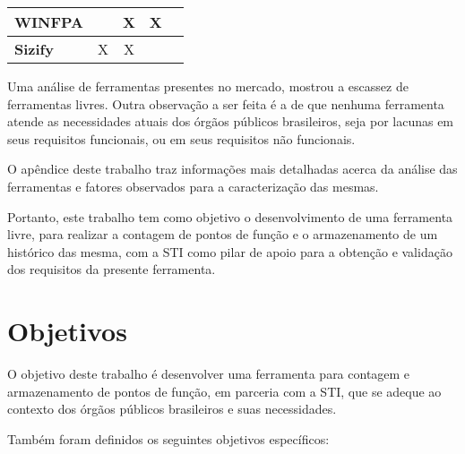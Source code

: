 \begin{table}[]
{\begin{tabular}{|l|c|c|c|c|}
\textbf{WINFPA}                                                              &                               & X                                                                                 & X                           &                              \\ \hline
\textbf{Sizify}                                                              & X                             & X                                                                                 &                             &                              \\ \hline
\end{tabular}
}
\end{table}

Uma análise de ferramentas presentes no mercado, mostrou a escassez de ferramentas livres. Outra observação a ser feita é a de que nenhuma ferramenta atende as necessidades atuais dos órgãos públicos brasileiros, seja por lacunas em seus requisitos funcionais, ou em seus requisitos não funcionais.

O apêndice  deste trabalho traz informações mais detalhadas acerca da análise das ferramentas e fatores observados para a caracterização das mesmas.

Portanto, este trabalho tem como objetivo o desenvolvimento de uma ferramenta livre, para realizar a contagem de pontos de função e o armazenamento de um histórico das mesma, com a STI como pilar de apoio para a obtenção e validação dos requisitos da presente ferramenta.

\section{Objetivos}

O objetivo deste  trabalho é desenvolver uma ferramenta para contagem e
armazenamento de pontos de função, em parceria com a STI, que se adeque ao
contexto dos órgãos públicos brasileiros e suas necessidades.

Também foram definidos os seguintes objetivos específicos:

